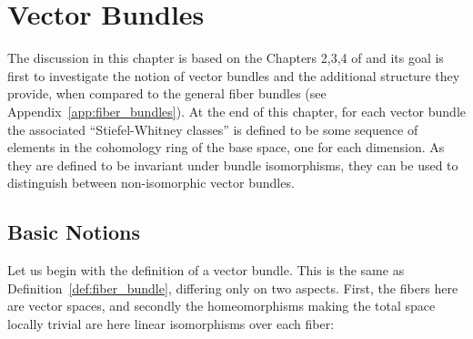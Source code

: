 \chapter{Vector Bundles}\label{chap:vector_bundles}
The discussion in this chapter is based on the Chapters 2,3,4 of \cite{char_class} and its goal is first to investigate the notion of vector bundles and the additional structure they provide, when compared to the general fiber bundles (see Appendix~\ref{app:fiber_bundles}). At the end of this chapter, for each vector bundle the associated ``Stiefel-Whitney classes'' is defined to be some sequence of elements in the cohomology ring of the base space, one for each dimension. As they are defined to be invariant under bundle isomorphisms, they can be used to distinguish between non-isomorphic vector bundles.

\section{Basic Notions}
Let us begin with the definition of a vector bundle. This is the same as Definition~\ref{def:fiber_bundle}, differing only on two aspects. First, the fibers here are vector spaces, and secondly the homeomorphisms making the total space locally trivial are here linear isomorphisms over each fiber:

